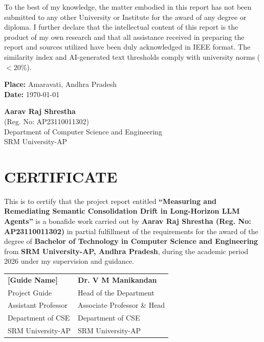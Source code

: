 \documentclass[12pt,a4paper]{report}
\begin{document}
To the best of my knowledge, the matter embodied in this report has not been submitted to any other University or Institute for the award of any degree or diploma. I further declare that the intellectual content of this report is the product of my own research and that all assistance received in preparing the report and sources utilized have been duly acknowledged in IEEE format. The similarity index and AI-generated text thresholds comply with university norms ($<20\%$).

\vspace{2cm}
\noindent
\textbf{Place:} Amaravati, Andhra Pradesh\\
\textbf{Date:} \today

\vspace{1.5cm}
\begin{flushright}
\textbf{Aarav Raj Shrestha}\\
(Reg. No: AP23110011302)\\
Department of Computer Science and Engineering\\
SRM University-AP
\end{flushright}

\clearpage

\chapter*{CERTIFICATE}

This is to certify that the project report entitled \textbf{``Measuring and Remediating Semantic Consolidation Drift in Long-Horizon LLM Agents''} is a bonafide work carried out by \textbf{Aarav Raj Shrestha (Reg. No: AP23110011302)} in partial fulfillment of the requirements for the award of the degree of \textbf{Bachelor of Technology in Computer Science and Engineering} from \textbf{SRM University-AP, Andhra Pradesh}, during the academic period 2026 under my supervision and guidance.

\vspace{3cm}
\noindent
\begin{tabular}{p{7.5cm}p{7.5cm}}
\textbf{[Guide Name]} & \textbf{Dr. V M Manikandan} \\
Project Guide & Head of the Department \\
Assistant Professor & Associate Professor \& Head \\
Department of CSE & Department of CSE \\
SRM University-AP & SRM University-AP
\end{tabular}
\end{document}

